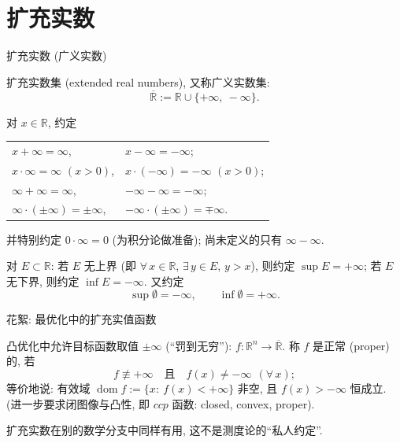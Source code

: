 
\section{扩充实数}


\begin{frame}{扩充实数 (广义实数)}

\begin{Def}[扩充实数]
\alert{扩充实数集} (extended real numbers), 又称\alert{广义实数集}:
\[
\overline{\mathbb{R}} := \mathbb{R} \cup \{+\infty,\ -\infty\}.
\]
\end{Def}

\pause

对 $x \in \mathbb{R}$, 约定
\begin{center}
\begin{tabular}{ll}
$x + \infty = \infty$, & $x - \infty = -\infty$; \\
$x \cdot \infty = \infty$ $(x > 0)$, & $x \cdot (-\infty) = -\infty$ $(x > 0)$; \\
$\infty + \infty = \infty$, & $-\infty - \infty = -\infty$; \\
$\infty \cdot (\pm\infty) = \pm\infty$, & $-\infty \cdot (\pm\infty) = \mp\infty$.
\end{tabular}
\end{center}
并特别\alert{约定 $0 \cdot \infty = 0$} (为积分论做准备); 尚未定义的只有 $\infty - \infty$.

\pause

\begin{remark}[上、下确界的扩充]
对 $E \subset \mathbb{R}$: 若 $E$ 无上界 (即 $\forall\, x \in \mathbb{R}$, $\exists\, y \in E$, $y > x$), 则约定 $\sup E = +\infty$; 若 $E$ 无下界, 则约定 $\inf E = -\infty$. 又约定
\[
\sup \emptyset = -\infty, \qquad \inf \emptyset = +\infty .
\]
\end{remark}

\end{frame}


\graymode
\begin{frame}{花絮: 最优化中的扩充实值函数}

\begin{eg}[正常凸函数]
凸优化中允许目标函数取值 $\pm\infty$ (``罚到无穷''): $f: \mathbb{R}^n \to \overline{\mathbb{R}}$. 称 $f$ 是\alert{正常} (proper) 的, 若
\[
f \not\equiv +\infty \quad \text{且} \quad f(x) \neq -\infty \ \ (\forall\, x);
\]
等价地说: \alert{有效域} $\operatorname{dom} f := \{x:\ f(x) < +\infty\}$ 非空, 且 $f(x) > -\infty$ 恒成立.
(进一步要求闭图像与凸性, 即 $ccp$ 函数: closed, convex, proper).

扩充实数在别的数学分支中同样有用, 这不是测度论的``私人约定''.
\end{eg}

\end{frame}
\normalmode

